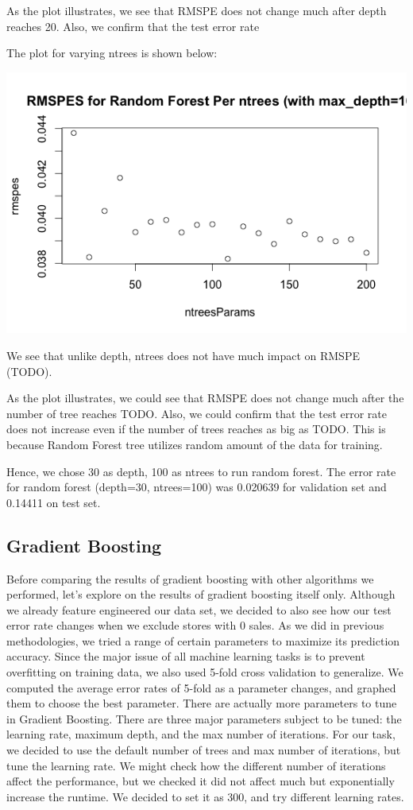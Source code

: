 \documentclass[letterpaper,twocolumn,10pt]{article}
\begin{document}
As the plot illustrates, we see that RMSPE does not change much after depth reaches 20. Also, we confirm that the test error rate 

The plot for varying ntrees is shown below:

\includegraphics[scale=0.35]{img/RandomForestPerNtrees.png}

We see that unlike depth, ntrees does not have much impact on RMSPE (TODO).

As the plot illustrates, we could see that RMSPE does not change much after the number of tree reaches TODO. Also, we could confirm that the test error rate does not increase even if the number of trees reaches as big as TODO. This is because Random Forest tree utilizes random amount of the data for training. 

Hence, we chose 30 as depth, 100 as ntrees to run random forest. The error rate for random forest (depth=30, ntrees=100) was 0.020639 for validation set and 0.14411 on test set.

\subsection{Gradient Boosting}
Before comparing the results of gradient boosting with other algorithms we performed, let's explore on the results of gradient boosting itself only. Although we already feature engineered our data set, we decided to also see how our test error rate changes when we exclude stores with 0 sales. As we did in previous methodologies, we tried a range of certain parameters to maximize its prediction accuracy. Since the major issue of all machine learning tasks is to prevent overfitting on training data, we also used 5-fold cross validation to generalize. We computed the average error rates of 5-fold as a parameter changes, and graphed them to choose the best parameter. There are actually more parameters to tune in Gradient Boosting. There are three major parameters subject to be tuned: the learning rate, maximum depth, and the max number of iterations. For our task, we decided to use the default number of trees and max number of iterations, but tune the learning rate. We might check how the different number of iterations affect the performance, but we checked it did not affect much but exponentially increase the runtime. We decided to set it as 300, and try different learning rates. 
\end{document}
